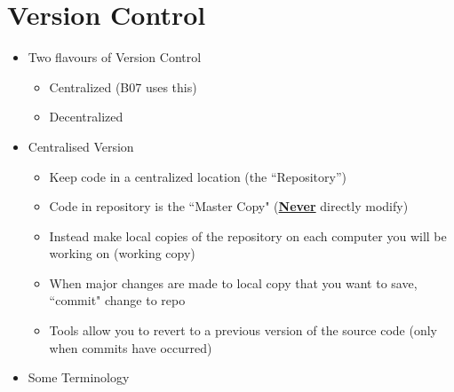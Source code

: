 %
%
%
	\section{Version Control}

	\begin{itemize}
		\item Two flavours of Version Control
		\begin{itemize}
			\item Centralized (B07 uses this)
			\item Decentralized
		\end{itemize}

		\item Centralised Version
		\begin{itemize}
			\item Keep code in a centralized location (the “Repository”)
			\item Code in repository is the ``Master Copy" (\textbf{\underline{Never}} directly modify)
			\item Instead make local copies of the repository on each computer you will be working on (working copy)
			\item When major changes are made to local copy that you want to save, ``commit" change to repo
			\item Tools allow you to revert to a previous version of the source code (only when commits have occurred)
		\end{itemize}

		\item Some Terminology
			\vspace{\the\itemsep}




\end{itemize}
